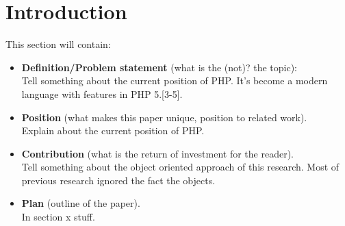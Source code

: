 \documentclass[../main.tex]{subfiles}
\begin{document}
    \section{Introduction}\label{sec:introduction}
    This section will contain:
    \begin{itemize}[noitemsep,nolistsep]
        \item \textbf{Definition/Problem statement} (what is the (not)? the topic):
        \\
        Tell something about the current position of PHP. It's become a modern language with features in PHP 5.[3-5].
        \item \textbf{Position} (what makes this paper unique, position to related work).
        \\
        Explain about the current position of PHP. 
        \item \textbf{Contribution} (what is the return of investment for the reader).
        \\
        Tell something about the object oriented approach of this research. Most of previous research ignored the fact the objects.
        \item \textbf{Plan} (outline of the paper).
        \\
        In section x stuff.
    \end{itemize}
    
\end{document}
